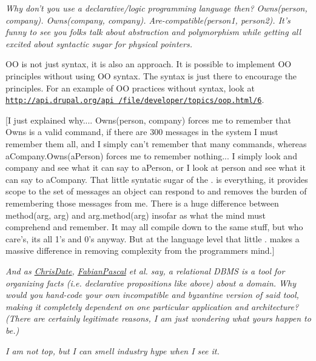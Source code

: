 \documentclass[10pt,twoside,openright]{memoir}
\begin{document}
\emph{Why don't you use a declarative/logic programming language then? Owns(person, company). Owns(company, company). Are-compatible(person1, person2). It's funny to see you folks talk about abstraction and polymorphism while getting all excited about syntactic sugar for physical pointers.}

OO is not just syntax, it is also an approach. It is possible to implement OO principles without using OO syntax. The syntax is just there to encourage the principles. For an example of OO practices without syntax, look at \ul{\footnotesize \texttt{http://api.drupal.org/api /file/developer/topics/oop.html/6}}.

[I just explained why.... Owns(person, company) forces me to remember that Owns is a valid command, if there are 300 messages in the system I must remember them all, and I simply can't remember that many commands, whereas aCompany.Owns(aPerson) forces me to remember nothing... I simply look and company and see what it can say to aPerson, or I look at person and see what it can say to aCompany. That little syntatic sugar of the . is everything, it provides scope to the set of messages an object can respond to and removes the burden of remembering those messages from me. There is a huge difference between method(arg, arg) and arg.method(arg) insofar as what the mind must comprehend and remember. It may all compile down to the same stuff, but who care's, its all 1's and 0's anyway. But at the language level that little . makes a massive difference in removing complexity from the programmers mind.]

\emph{And as \ul{ChrisDate}, \ul{FabianPascal} et al. say, a relational DBMS is a tool for organizing facts (i.e. declarative propositions like above) about a domain. Why would you hand-code your own incompatible and byzantine version of said tool, making it completely dependent on one particular application and architecture? (There are certainly legitimate reasons, I am just wondering what yours happen to be.)}

\emph{I am not top, but I can smell industry hype when I see it.}
\end{document}
